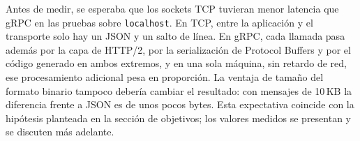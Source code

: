 Antes de medir, se esperaba que los sockets TCP tuvieran menor latencia que gRPC en las pruebas sobre \texttt{localhost}. En TCP, entre la aplicación y el transporte solo hay un JSON y un salto de línea. En gRPC, cada llamada pasa además por la capa de HTTP/2, por la serialización de Protocol Buffers y por el código generado en ambos extremos, y en una sola máquina, sin retardo de red, ese procesamiento adicional pesa en proporción. La ventaja de tamaño del formato binario tampoco debería cambiar el resultado: con mensajes de 10\,KB la diferencia frente a JSON es de unos pocos bytes. Esta expectativa coincide con la hipótesis planteada en la sección de objetivos; los valores medidos se presentan y se discuten más adelante.